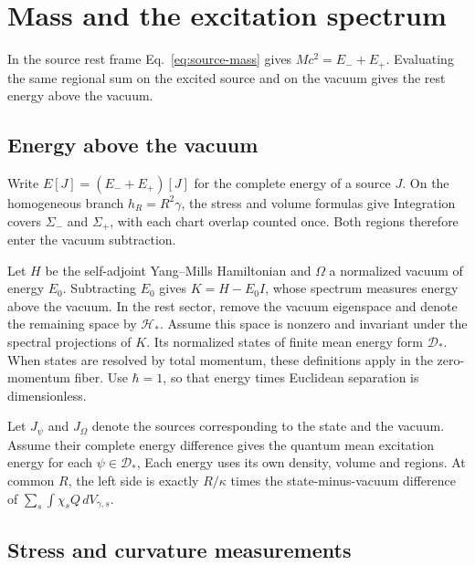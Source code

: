 \section{Mass and the excitation spectrum}
\label{sec:excitation-spectrum}

In the source rest frame Eq.~\eqref{eq:source-mass} gives \(Mc^2=E_-+E_+\). Evaluating the same regional sum on the excited source and on the vacuum gives the rest energy above the vacuum.

\subsection{Energy above the vacuum}

Write \(E[J]=(E_-+E_+)[J]\) for the complete energy of a source \(J\). On the homogeneous branch \(h_R=R^2\gamma\), the stress and volume formulas give
\SpectrumSourceEnergyDisplay
Integration covers \(\Sigma_-\) and \(\Sigma_+\), with each chart overlap counted once. Both regions therefore enter the vacuum subtraction.

Let \(H\) be the self-adjoint Yang--Mills Hamiltonian and \(\Omega\) a normalized vacuum of energy \(E_0\). Subtracting \(E_0\) gives \(K=H-E_0I\), whose spectrum measures energy above the vacuum. In the rest sector, remove the vacuum eigenspace and denote the remaining space by \(\mathcal H_*\). Assume this space is nonzero and invariant under the spectral projections of \(K\). Its normalized states of finite mean energy form \(\mathcal D_*\). When states are resolved by total momentum, these definitions apply in the zero-momentum fiber. Use \(\hbar=1\), so that energy times Euclidean separation is dimensionless.

Let \(J_\psi\) and \(J_\Omega\) denote the sources corresponding to the state and the vacuum. Assume their complete energy difference gives the quantum mean excitation energy for each \(\psi\in\mathcal D_*\),
\SpectrumEnergyFormDisplay
Each energy uses its own density, volume and regions. At common \(R\), the left side is exactly \(R/\kappa\) times the state-minus-vacuum difference of \(\sum_s\int\chi_s Q\,dV_{\gamma,s}\).

\subsection{Stress and curvature measurements}

